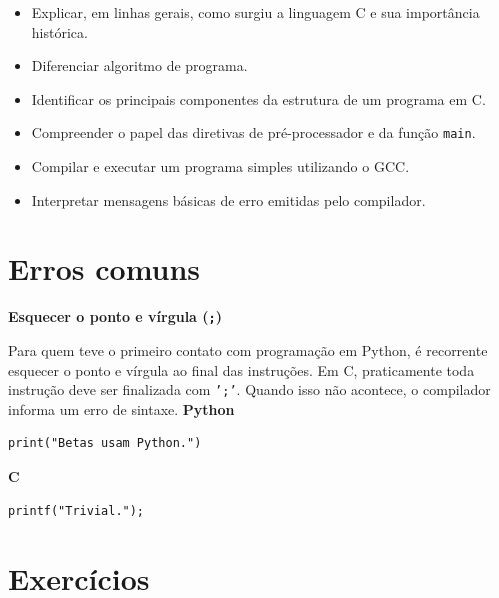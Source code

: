 \begin{objetivos}

\begin{itemize}
    \item Explicar, em linhas gerais, como surgiu a linguagem C e sua importância histórica.
    \item Diferenciar algoritmo de programa.
    \item Identificar os principais componentes da estrutura de um programa em C.
    \item Compreender o papel das diretivas de pré-processador e da função \texttt{main}.
    \item Compilar e executar um programa simples utilizando o GCC.
    \item Interpretar mensagens básicas de erro emitidas pelo compilador.
\end{itemize}

\end{objetivos}

\section*{Erros comuns}

\begin{errocomum}

\textbf{Esquecer o ponto e vírgula (\texttt{;})}

Para quem teve o primeiro contato com programação em Python, é recorrente esquecer o ponto e vírgula ao final das instruções. Em C, praticamente toda instrução deve ser finalizada com \texttt{';'}. Quando isso não acontece, o compilador informa um erro de sintaxe.
\newline
\newline \textbf{Python}

\begin{lstlisting}
print("Betas usam Python.")
\end{lstlisting}

\textbf{C}

\begin{lstlisting}
printf("Trivial.");
\end{lstlisting}

\end{errocomum}


\section*{Exercícios}

